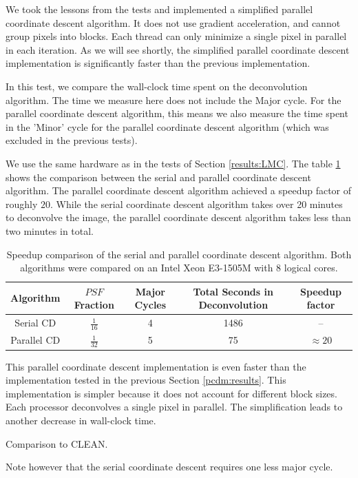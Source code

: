 We took the lessons from the tests and implemented a simplified parallel coordinate descent algorithm. It does not use gradient acceleration, and cannot group pixels into blocks. Each thread can only minimize a single pixel in parallel in each iteration. As we will see shortly, the simplified parallel coordinate descent implementation is significantly faster than the previous implementation.

In this test, we compare the wall-clock time spent on the deconvolution algorithm. The time we measure here does not include the Major cycle. For the parallel coordinate descent algorithm, this means we also measure the time spent in the 'Minor' cycle for the parallel coordinate descent algorithm (which was excluded in the previous tests).

We use the same hardware as in the tests of Section \ref{results:LMC}. The table \ref{pcdm:comp:table} shows the comparison between the serial and parallel coordinate descent algorithm. The parallel coordinate descent algorithm achieved a speedup factor of roughly $20$. While the serial coordinate descent algorithm takes over 20 minutes to deconvolve the image, the parallel coordinate descent algorithm takes less than two minutes in total.

\begin{table} [h]
	\centering
	\begin{tabular}{c | c | c | c | c}
		Algorithm &  $PSF$ Fraction & Major Cycles & Total Seconds in Deconvolution & Speedup factor\\ \hline
		Serial CD & $\frac{1}{16}$ & 4 & 1486 & --\\
		Parallel CD & $\frac{1}{32}$ & 5 & 75 & $\approx 20$ \\
	\end{tabular}
	\caption{Speedup comparison of the serial and parallel coordinate descent algorithm. Both algorithms were compared on an Intel Xeon E3-1505M with 8 logical cores.}
	\label{pcdm:comp:table}
\end{table}

This parallel coordinate descent implementation is even faster than the implementation tested in the previous Section \ref{pcdm:results}. This implementation is simpler because it does not account for different block sizes. Each processor deconvolves a single pixel in parallel. The simplification leads to another decrease in wall-clock time.

Comparison to CLEAN.

Note however that the serial coordinate descent requires one less major cycle.

